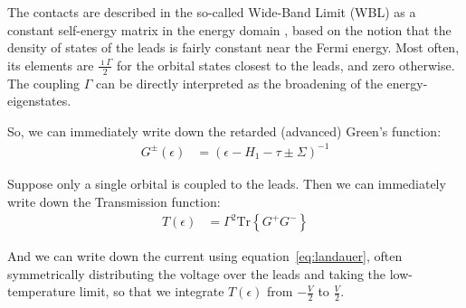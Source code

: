 The contacts are described in the so-called Wide-Band Limit (WBL) as a constant self-energy matrix in the energy domain \cite{wbl}, based on the notion that the density of states of the leads is fairly constant near the Fermi energy. Most often, its elements are $\frac{\imath \Gamma}{2}$ for the orbital states closest to the leads, and zero otherwise. The coupling $\Gamma$ can be directly interpreted as the broadening of the energy-eigenstates.

So, we can immediately write down the retarded (advanced) Green's function:
\begin{align}
G^\pm(\epsilon) &= \left(\epsilon - H_1 - \tau \pm \Sigma\right)^{-1}
\label{eq:commongf}
\end{align}

Suppose only a single orbital is coupled to the leads. Then we can immediately write down the Transmission function:
\begin{align}
T(\epsilon) &= \Gamma^2\text{Tr}\left\{G^+ G^-\right\}
\label{eq:commonte}
\end{align}

And we can write down the current using equation~\ref{eq:landauer}, often symmetrically distributing the voltage over the leads and taking the low-temperature limit, so that we integrate $T(\epsilon)$ from $-\frac{V}{2}$ to $\frac{V}{2}$. 



